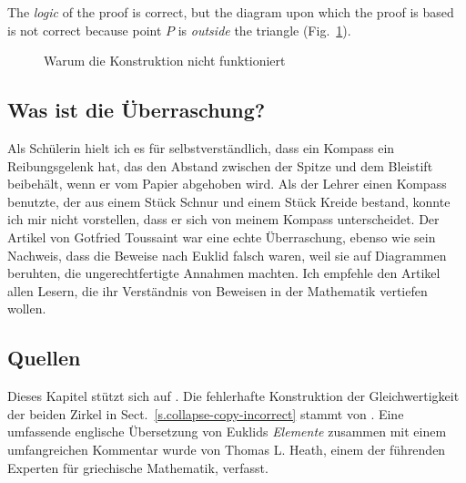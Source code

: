 The \emph{logic} of the proof is correct, but the diagram upon which the proof is based is not correct because point $P$ is \emph{outside} the triangle (Fig.~\ref{f.collapse-isoceles-2}).

\begin{figure}[b]
\begin{center}
\caption{Warum die Konstruktion nicht funktioniert}\label{f.collapse-isoceles-2}
\end{center}
\end{figure}

\subsection*{Was ist die Überraschung?}

Als Schülerin hielt ich es für selbstverständlich, dass ein Kompass ein Reibungsgelenk hat, das den Abstand zwischen der Spitze und dem Bleistift beibehält, wenn er vom Papier abgehoben wird. Als der Lehrer einen Kompass benutzte, der aus einem Stück Schnur und einem Stück Kreide bestand, konnte ich mir nicht vorstellen, dass er sich von meinem Kompass unterscheidet. Der Artikel von Gotfried Toussaint war eine echte Überraschung, ebenso wie sein Nachweis, dass die Beweise nach Euklid falsch waren, weil sie auf Diagrammen beruhten, die ungerechtfertigte Annahmen machten. Ich empfehle den Artikel allen Lesern, die ihr Verständnis von Beweisen in der Mathematik vertiefen wollen.

\newpage

\subsection*{Quellen}

Dieses Kapitel stützt sich auf \cite{toussaint}. Die fehlerhafte Konstruktion der Gleichwertigkeit der beiden Zirkel in Sect.~\ref{s.collapse-copy-incorrect} stammt von \cite{rusty}. Eine umfassende englische Übersetzung von Euklids \textit{Elemente} zusammen mit einem umfangreichen Kommentar \cite{euclid} wurde von Thomas L. Heath, einem der führenden Experten für griechische Mathematik, verfasst.
